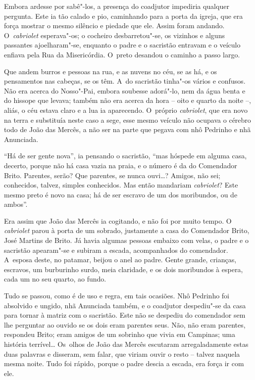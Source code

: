 Embora ardesse por sabê"-los, a presença do coadjutor impediria qualquer
pergunta. Este ia tão calado e pio, caminhando para a porta da igreja,
que era força mostrar o mesmo silêncio e piedade que ele. Assim foram
andando. O~\emph{cabriolet} esperava"-os; o cocheiro desbarretou"-se, os
vizinhos e alguns passantes ajoelharam"-se, enquanto o padre e o
sacristão entravam e o veículo enfiava pela Rua da Misericórdia. O~preto
desandou o caminho a passo largo.

Que andem burros e pessoas na rua, e as nuvens no céu, se as há, e os
pensamentos nas cabeças, se os têm. A~do sacristão tinha"-os vários e
confusos. Não era acerca do Nosso"-Pai, embora soubesse adorá"-lo, nem da
água benta e do hissope que levava; também não era acerca da hora --
oito e quarto da noite --, aliás, o céu estava claro e a lua ia
aparecendo. O~próprio \emph{cabriolet}, que era novo na terra e
substituía neste caso a sege, esse mesmo veículo não ocupava o cérebro
todo de João das Mercês, a não ser na parte que pegava com nhô Pedrinho
e nhã Anunciada.

``Há de ser gente nova'', ia pensando o sacristão, ``mas hóspede em
alguma casa, decerto, porque não há casa vazia na praia, e o número é da
do Comendador Brito. Parentes, serão? Que parentes, se nunca ouvi\ldots{}?
Amigos, não sei; conhecidos, talvez, simples conhecidos. Mas então
mandariam \emph{cabriolet}? Este mesmo preto é novo na casa; há de ser
escravo de um dos moribundos, ou de ambos''.

Era assim que João das Mercês ia cogitando, e não foi por muito tempo. O
\emph{cabriolet} parou à porta de um sobrado, justamente a casa do
Comendador Brito, José Martins de Brito. Já havia algumas pessoas
embaixo com velas, o padre e o sacristão apearam"-se e subiram a escada,
acompanhados do comendador. A~esposa deste, no patamar, beijou o anel ao
padre. Gente grande, crianças, escravos, um burburinho surdo, meia
claridade, e os dois moribundos à espera, cada um no seu quarto, ao
fundo.

Tudo se passou, como é de uso e regra, em tais ocasiões. Nhô Pedrinho
foi absolvido e ungido, nhã Anunciada também, e o coadjutor despediu"-se
da casa para tornar à matriz com o sacristão. Este não se despediu do
comendador sem lhe perguntar ao ouvido se os dois eram parentes seus.
Não, não eram parentes, respondeu Brito; eram amigos de um sobrinho que
vivia em Campinas; uma história terrível\ldots{} Os~olhos de João das Mercês
escutaram arregaladamente estas duas palavras e disseram, sem falar, que
viriam ouvir o resto -- talvez naquela mesma noite. Tudo foi rápido,
porque o padre descia a escada, era força ir com ele.

